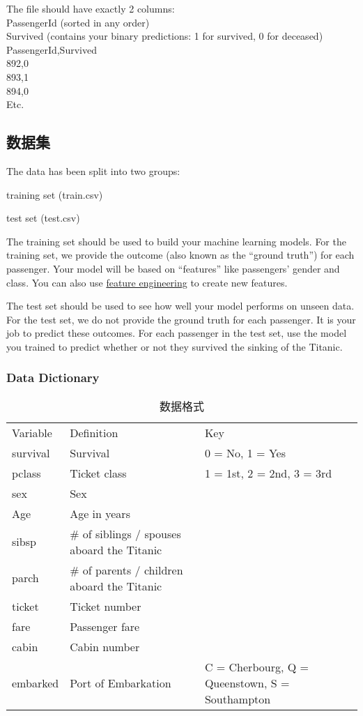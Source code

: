 \documentclass[10pt,a4paper]{ctexbook}
\begin{document}
The file should have exactly 2 columns:\\
PassengerId (sorted in any order)\\
Survived (contains your binary predictions: 1 for survived, 0 for deceased)\\
PassengerId,Survived\\
892,0\\
893,1\\
894,0\\
Etc.\\

\subsection{数据集}
The data has been split into two groups:

training set (train.csv)

test set (test.csv)

The training set should be used to build your machine learning models. For the training set, we provide the outcome (also known as the “ground truth”) for each passenger. Your model will be based on “features” like passengers’ gender and class. You can also use \href{https://triangleinequality.wordpress.com/2013/09/08/basic-feature-engineering-with-the-titanic-data/}{feature engineering} to create new features.

The test set should be used to see how well your model performs on unseen data. For the test set, we do not provide the ground truth for each passenger. It is your job to predict these outcomes. For each passenger in the test set, use the model you trained to predict whether or not they survived the sinking of the Titanic.

\subsubsection{Data Dictionary}
\begin{table}[H]
\centering
\begin{tabular}{lll}
Variable & Definition & Key \\
survival & Survival & 0 = No, 1 = Yes \\
pclass   & Ticket class & 1 = 1st, 2 = 2nd, 3 = 3rd \\
sex      & Sex \\
Age      & Age in years \\
sibsp    & \# of siblings / spouses aboard the Titanic \\
parch    & \# of parents / children aboard the Titanic \\
ticket   & Ticket number \\
fare     & Passenger fare \\
cabin    & Cabin number \\
embarked & Port of Embarkation & C = Cherbourg, Q = Queenstown, S = Southampton \\
\end{tabular}%
\caption{数据格式}
\label{tab:complex-entropy}
\end{table}
\end{document}

